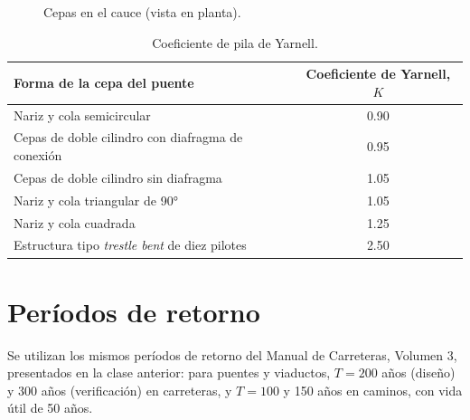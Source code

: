 \begin{figure}[H]
\centering
{}
\caption{Cepas en el cauce (vista en planta).}
\end{figure}

\begin{table}[H]
\centering
\begin{tabular}{lc}
\toprule
\textbf{Forma de la cepa del puente} & \textbf{Coeficiente de Yarnell, $K$}\\
\midrule
Nariz y cola semicircular & 0.90\\
Cepas de doble cilindro con diafragma de conexión & 0.95\\
Cepas de doble cilindro sin diafragma & 1.05\\
Nariz y cola triangular de 90° & 1.05\\
Nariz y cola cuadrada & 1.25\\
Estructura tipo \emph{trestle bent} de diez pilotes & 2.50\\
\bottomrule
\end{tabular}
\caption{Coeficiente de pila de Yarnell.}
\end{table}

\section{Períodos de retorno}
Se utilizan los mismos períodos de retorno del Manual de Carreteras,
Volumen 3, presentados en la clase anterior: para puentes y viaductos,
$T=200$ años (diseño) y 300 años (verificación) en carreteras, y $T=100$ y
150 años en caminos, con vida útil de 50 años.
